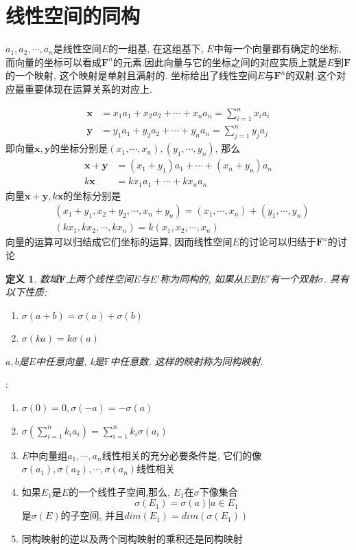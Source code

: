 \documentclass[a4paper,11pt]{book}
\newtheorem{definition}{\hspace{2em}定义}[section]
\begin{document}
\section{线性空间的同构}
$a_1,a_2,\cdots,a_n$是线性空间$E$的一组基, 在这组基下, $E$中每一个向量都有确定的坐标, 而向量的坐标可以看成$\mathbf{F}^n$的元素.因此向量与它的坐标之间的对应实质上就是$E$到$\mathbf{F}$的一个映射, 这个映射是单射且满射的. 坐标给出了线性空间$E$与$\mathbf{F}^n$的双射.这个对应最重要体现在运算关系的对应上.

\begin{equation*}
\begin{split}
   \mathbf{x}&=x_1a_1+x_2a_2+\cdots+x_na_n=\sum_{i=1}^{n}x_ia_i \\
   \mathbf{y}&=y_1a_1+y_2a_2+\cdots+y_na_n=\sum_{j=1}^{n}y_ja_j
\end{split}
\end{equation*}
即向量$\mathbf{x},\mathbf{y}$的坐标分别是$(x_1,\cdots,x_n),(y_1,\cdots,y_n)$, 那么
\begin{equation*}
\begin{split}
  \mathbf{x}+\mathbf{y}&=(x_1+y_1)a_1+\cdots+(x_n+y_n)a_n\\
  k\mathbf{x}&=kx_1a_1+\cdots+kx_na_n
\end{split}
\end{equation*}
向量$\mathbf{x}+\mathbf{y},k\mathbf{x}$的坐标分别是
\begin{equation*}
\begin{split}
  &(x_1+y_1,x_2+y_2,\cdots,x_n+y_n)=(x_1,\cdots,x_n)+(y_1,\cdots,y_n)\\
  &(kx_1,kx_2,\cdots,kx_n)=k(x_1,x_2,\cdots,x_n)
\end{split}
\end{equation*}
向量的运算可以归结成它们坐标的运算, 因而线性空间$E$的讨论可以归结于$\mathbf{F}^n$的讨论
\begin{definition}
  数域$\mathbf{F}$上两个线性空间$E$与$E'$称为同构的, 如果从$E$到$E'$有一个双射$\sigma$. 具有以下性质:
  \begin{enumerate}[(1)]
    \item $\sigma(a+b)=\sigma(a)+\sigma(b)$
    \item $\sigma(ka)=k\sigma(a)$
  \end{enumerate}
  $a,b$是$E$中任意向量, k是$\mathbb{F}$中任意数, 这样的映射称为同构映射.
\end{definition}
:
\begin{enumerate}[(1)]
  \item $\sigma(0)=0,\sigma(-a)=-\sigma(a)$
  \item $\sigma(\sum_{i=1}^{n}k_ia_i)=\sum_{i=1}^{n}k_i\sigma(a_i)$
  \item $E$中向量组$a_1,\cdots,a_n$线性相关的充分必要条件是, 它们的像$\sigma(a_1),\sigma(a_2),\cdots,\sigma(a_n)$线性相关
  \item 如果$E_1$是$E$的一个线性子空间,那么, $E_1$在$\sigma$下像集合
  \begin{equation*}
    \sigma(E_1)={\sigma(a)|a\in E_1}
  \end{equation*}
  是$\sigma(E)$的子空间, 并且$dim(E_1)=dim(\sigma(E_1))$
  \item 同构映射的逆以及两个同构映射的乘积还是同构映射
\end{enumerate}
\end{document}
